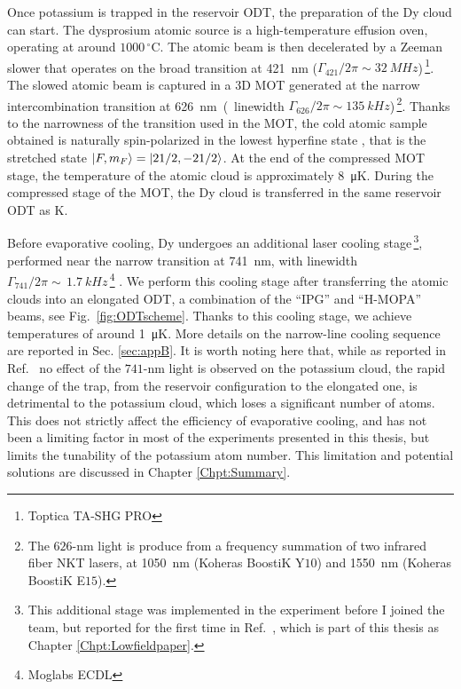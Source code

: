 Once potassium is trapped in the reservoir \ac{ODT}, the preparation of the Dy cloud can start. The dysprosium atomic source is a high-temperature effusion oven, operating at around $1000\,^\circ$C. The atomic beam is then decelerated by a Zeeman slower that operates on the broad transition at \SI{421}{nm} ($\Gamma_{421}/2\pi\sim\SI{32}{MHz}$)\,\footnote{Toptica TA-SHG PRO}. The slowed atomic beam is captured in a $3$D \ac{MOT} generated at the narrow intercombination transition at \SI{626}nm (linewidth $\Gamma_{626}/2\pi\sim\SI{135}{kHz}$)\,\footnote{The $626$-nm light is produce from a frequency summation of two infrared fiber NKT lasers, at \SI{1050}{nm} (Koheras BoostiK Y$10$) and \SI{1550}{nm} (Koheras BoostiK E$15$).}. Thanks to the narrowness of the transition used in the \ac{MOT}, the cold atomic sample obtained is naturally spin-polarized in the lowest hyperfine state \cite{Dreon2017oca}, that is the stretched state $\ket{{F}, {m_F}}=\ket{21/2, -21/2}$. At the end of the compressed \ac{MOT} stage, the temperature of the atomic cloud is approximately \SI{8}{\micro K}. During the compressed stage of the \ac{MOT}, the Dy cloud is transferred in the same reservoir \ac{ODT} as K. 

Before evaporative cooling, Dy undergoes an additional laser cooling stage\,\footnote{This additional stage was implemented in the experiment before I joined the team, but reported for the first time in Ref.~\cite{Ye2022ool}, which is part of this thesis as Chapter \ref{Chpt:Lowfieldpaper}.}, performed near the narrow transition at \SI{741}{nm}, with linewidth $\Gamma_{741}/2\pi\sim\,\SI{1.7}{kHz}$\,\footnote{Moglabs ECDL} \cite{Lu2011soa}. We perform this cooling stage after transferring the atomic clouds into an elongated \ac{ODT}, a combination of the ``IPG'' and ``H-MOPA'' beams, see Fig.~\ref{fig:ODTscheme}. Thanks to this cooling stage, we achieve temperatures of around \SI{1}{\micro K}. More details on the narrow-line cooling sequence are reported in Sec. \ref{sec:appB}. It is worth noting here that, while as reported in Ref.~\cite{Ye2022ool} no effect of the $741$-nm light is observed on the potassium cloud, the rapid change of the trap, from the reservoir configuration to the elongated one, is detrimental to the potassium cloud, which loses a significant number of atoms. This does not strictly affect the efficiency of evaporative cooling, and has not been a limiting factor in most of the experiments presented in this thesis, but limits the tunability of the potassium atom number. This limitation and potential solutions are discussed in Chapter \ref{Chpt:Summary}. 


